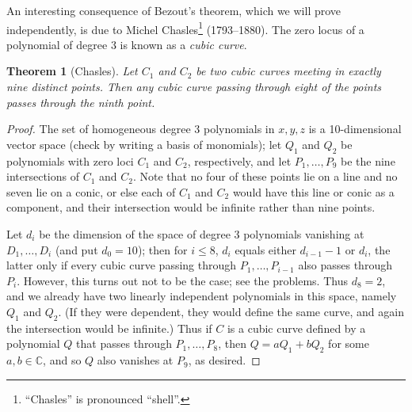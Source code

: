 \documentclass[12pt]{book}
\numberwithin{exc}{section}
\numberwithin{figure}{section}
\newtheorem{theorem}{Theorem}[section]
\numberwithin{equation}{theorem}
\def\CC{\mathbb{C}}
\begin{document}
An interesting consequence of Bezout's theorem,
which we will prove independently, is 
due to Michel Chasles\footnote{``Chasles'' is pronounced ``shell''.}
(1793--1880).  The zero locus of a polynomial 
of degree 3 is known as a \emph{cubic curve}. 
\begin{theorem}[Chasles]
Let $C_{1}$ and $C_{2}$ be two cubic curves meeting in exactly nine 
distinct points. Then any cubic curve passing through eight of the 
points passes through the ninth point.
\end{theorem}
\begin{proof}
The set of homogeneous degree 3 polynomials in $x,y,z$ is a 
10-dimensional vector space (check by writing a basis of monomials); 
let $Q_1$ and $Q_2$ be polynomials with zero 
loci $C_1$ and $C_2$, respectively, and let $P_1, \dots, P_9$ be the 
nine intersections of $C_1$ and $C_2$. Note that no four of these 
points lie on a line and no seven lie on a conic,
or else each of $C_1$ and $C_2$ would have this 
line or conic as a component, and their intersection would be infinite 
rather than nine points.

Let $d_i$ be the dimension of the space of degree 3 polynomials vanishing 
at $D_1, \dots, D_i$ (and put $d_0 = 10$); then for $i \leq 8$, $d_i$ 
equals either $d_{i-1}-1$ or $d_i$, the latter only if every cubic 
curve
passing through $P_1, \dots, P_{i-1}$ also passes through $P_i$. 
However, this turns out not to be the case; see the problems.
Thus $d_8 = 2$, and we already have two linearly independent 
polynomials in this space, namely $Q_1$ and $Q_2$. (If they were 
dependent, they would define the same curve, and again the 
intersection would be infinite.) Thus if $C$ is a cubic curve defined 
by a polynomial $Q$ that passes through $P_1, \dots, P_8$, then $Q = 
aQ_1 + bQ_2$ for some $a,b \in \CC$, and so $Q$ also vanishes at 
$P_9$, as desired.
\end{proof}
\end{document}
